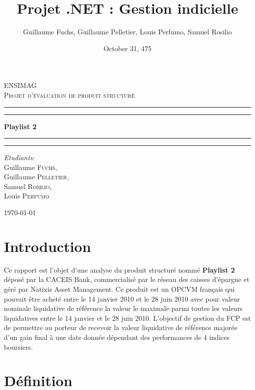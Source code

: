 \documentclass[french,12pt,a4paper]{article}
\title{Projet .NET : Gestion indicielle}
\date{October 31, 475}
\author{Guillaume Fuchs, Guillaume Pelletier, Louis Perfumo, Samuel Rosilio}
\begin{document}
\begin{titlepage}
\begin{center}

\textsc{\LARGE ENSIMAG}\\[1.5cm]

\textsc{\Large Projet d'évaluation de produit structuré}\\[0.5cm]

 \hrule
 \hrule 

\vspace{7mm}
{ \huge \bfseries Playlist 2  }

\vspace{7mm}
\hrule
\hrule

\vspace{7mm}
\begin{minipage}{0.4\textwidth}
\begin{flushleft} \large
\emph{Etudiants:}\\
Guillaume \textsc{Fuchs},\\
Guillaume \textsc{Pelletier},\\
Samuel \textsc{Rosilio},\\
Louis \textsc{Perfumo}
\end{flushleft}
\end{minipage}

\vfill

{\large \today}

\end{center}
\end{titlepage}
\tableofcontents
\newpage

\section{Introduction}

Ce rapport est l'objet d'une analyse du produit structuré nommé \textbf{Playlist 2} déposé par  la CACEIS Bank, commercialisé par le réseau des caisses d'épargne et géré par Natixis Asset Management.
Ce produit est un OPCVM français qui pouvait être acheté entre le 14 janvier 2010 et le 28 juin 2010 avec pour valeur nominale liquidative de référence la valeur le maximale parmi toutes les valeurs liquidatives entre le 14 janvier et le 28 juin 2010. L'objectif de gestion du FCP est de permettre au porteur de recevoir la valeur liquidative de référence majorée d'un gain final à une date donnée dépendant des performances de 4 indices boursiers. 


\section{Définition}
\end{document}
